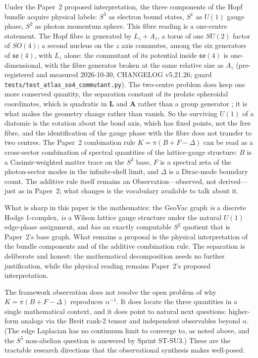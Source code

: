 \documentclass[aps,pra,twocolumn,superscriptaddress,longbibliography]{revtex4-2}
\begin{document}
Under the Paper~2 proposed interpretation, the three components
of the Hopf bundle acquire physical labels: $S^3$ as electron bound
states, $S^1$ as $U(1)$ gauge phase, $S^2$ as photon momentum sphere.
This fibre reading is a one-centre statement.  The Hopf fibre is
generated by $L_z + A_z$, a torus of one $SU(2)$ factor of $SO(4)$; a
second nucleus on the $z$ axis commutes, among the six generators of
$\mathfrak{so}(4)$, with $L_z$ alone: the commutant of its potential
inside $\mathfrak{so}(4)$ is one-dimensional,
with the fibre generator broken at the same relative size as $A_z$
(pre-registered and measured 2026-10-30, CHANGELOG v5.21.26; guard
\texttt{tests/test\_atlas\_so4\_commutant.py}).  The two-centre problem
does keep one more conserved quantity, the separation constant of its
prolate spheroidal coordinates, which is quadratic in $\mathbf{L}$ and
$\mathbf{A}$ rather than a group generator \cite{coulson1967}; it is
what makes the geometry change rather than vanish.  So the surviving
$U(1)$ of a diatomic is the rotation about the bond axis, which has
fixed points, not the free fibre, and the identification of the gauge
phase with the fibre does not transfer to two centres.
The Paper~2 combination rule $K = \pi(B + F - \Delta)$ can be read as a
cross-sector combination of spectral quantities of the lattice-gauge structure:
$B$ is a Casimir-weighted matter trace on the $S^2$ base, $F$ is a
spectral zeta of the photon-sector modes in the infinite-shell
limit, and $\Delta$ is a Dirac-mode boundary count.  The additive
rule itself remains an Observation---observed, not derived---just as
in Paper~2; what changes
is the vocabulary available to talk about it.

What is sharp in this paper is the mathematics: the GeoVac graph
\emph{is} a discrete Hodge 1-complex, \emph{is} a Wilson lattice
gauge structure under the natural $U(1)$ edge-phase assignment, and
\emph{has} an exactly computable $S^2$ quotient that is Paper~2's
base graph.  What remains a proposal is the physical interpretation of
the bundle components and of the additive combination rule.  The
separation is deliberate and honest: the mathematical decomposition
needs no further justification, while the physical reading remains
Paper~2's proposed interpretation.

The framework observation does not resolve the open problem of why
$K = \pi(B + F - \Delta)$ reproduces $\alpha^{-1}$.  It does locate
the three quantities in a single mathematical context, and it does
point to natural next questions: higher-form analogs via the Breit
rank-2 tensor and independent observables beyond $\alpha$.  (The edge
Laplacian has no continuum limit to converge to, as noted above, and
the $S^5$ non-abelian question is answered by Sprint ST-SU3.)  These are the tractable
research directions that the observational synthesis makes
well-posed.
\end{document}
